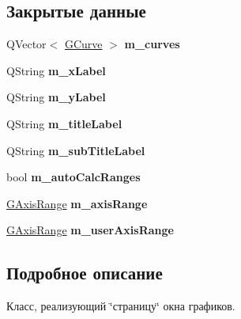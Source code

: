 \subsection*{Закрытые данные}
\begin{DoxyCompactItemize}
\item 
Q\+Vector$<$ \hyperlink{struct_g_curve}{G\+Curve} $>$ {\bfseries m\+\_\+curves}\hypertarget{class_graph_sheet_a970d65cbe6e836277bbf845962c84289}{}\label{class_graph_sheet_a970d65cbe6e836277bbf845962c84289}

\item 
Q\+String {\bfseries m\+\_\+x\+Label}\hypertarget{class_graph_sheet_a44b18b8ca129276833d543f0faf70008}{}\label{class_graph_sheet_a44b18b8ca129276833d543f0faf70008}

\item 
Q\+String {\bfseries m\+\_\+y\+Label}\hypertarget{class_graph_sheet_a65c42e7ee50cff1b41f200747c99b230}{}\label{class_graph_sheet_a65c42e7ee50cff1b41f200747c99b230}

\item 
Q\+String {\bfseries m\+\_\+title\+Label}\hypertarget{class_graph_sheet_a85647d1e1446c66ca9e215db1e3ab9a3}{}\label{class_graph_sheet_a85647d1e1446c66ca9e215db1e3ab9a3}

\item 
Q\+String {\bfseries m\+\_\+sub\+Title\+Label}\hypertarget{class_graph_sheet_aad55c740b2576ea491f66c83695395bb}{}\label{class_graph_sheet_aad55c740b2576ea491f66c83695395bb}

\item 
bool {\bfseries m\+\_\+auto\+Calc\+Ranges}\hypertarget{class_graph_sheet_a326acf4c64a807219abbd635482c370c}{}\label{class_graph_sheet_a326acf4c64a807219abbd635482c370c}

\item 
\hyperlink{struct_g_axis_range}{G\+Axis\+Range} {\bfseries m\+\_\+axis\+Range}\hypertarget{class_graph_sheet_a80184036212ce75a2c4799da5032f237}{}\label{class_graph_sheet_a80184036212ce75a2c4799da5032f237}

\item 
\hyperlink{struct_g_axis_range}{G\+Axis\+Range} {\bfseries m\+\_\+user\+Axis\+Range}\hypertarget{class_graph_sheet_a614acb7954caf3e7c28350d37bc8a6ca}{}\label{class_graph_sheet_a614acb7954caf3e7c28350d37bc8a6ca}

\end{DoxyCompactItemize}


\subsection{Подробное описание}
Класс, реализующий \char`\"{}страницу\char`\"{} окна графиков. 

